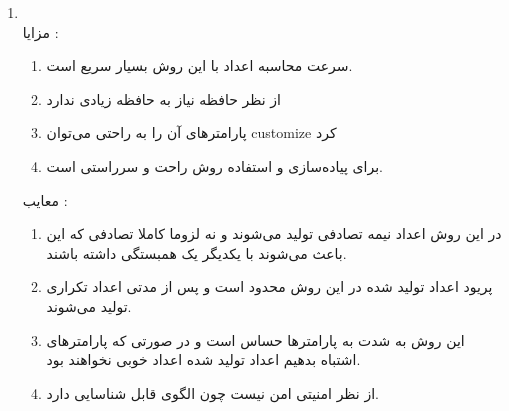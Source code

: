 \begin{enumerate}
    \item \phantom{text}
          \\
          مزایا :‌
          \\
          \begin{enumerate}
              \item سرعت محاسبه اعداد با این روش بسیار سریع است.
              \item از نظر حافظه نیاز به حافظه زیادی ندارد
              \item پارامترهای آن را به راحتی می‌توان customize کرد
              \item برای پیاده‌سازی و استفاده روش راحت و سرراستی است.
          \end{enumerate}
          معایب :‌
          \\
          \begin{enumerate}
            \item در این روش اعداد نیمه تصادفی تولید می‌شوند و نه لزوما کاملا تصادفی که این باعث می‌شوند با یکدیگر یک همبستگی داشته باشند.
            \item پریود اعداد تولید شده در این روش محدود است و پس از مدتی اعداد تکراری تولید می‌شوند.
            \item این روش به شدت به پارامترها حساس است و در صورتی که پارامترهای اشتباه بدهیم اعداد تولید شده اعداد خوبی نخواهند بود.
            \item از نظر امنیتی امن نیست چون الگوی قابل شناسایی دارد.
          \end{enumerate}
\end{enumerate}
